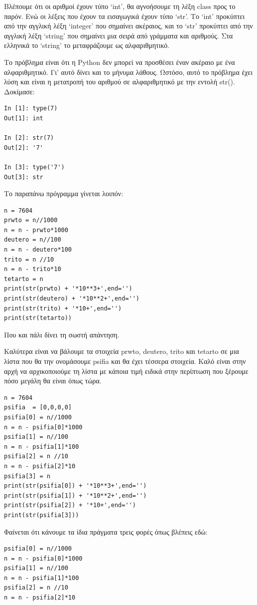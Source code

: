 Βλέπουμε ότι οι αριθμοί έχουν τύπο `int', θα αγνοήσουμε τη λέξη class προς το παρόν. Ενώ οι λέξεις που έχουν τα εισαγωγικά έχουν τύπο `str'. Το `int' προκύπτει από την αγγλική λέξη `integer' που σημαίνει ακέραιος, και το `str' προκύπτει από την αγγλική λέξη `string' που σημαίνει μια σειρά από γράμματα και αριθμούς. Στα ελληνικά το `string' το μεταφράζουμε ως αλφαριθμητικό.

Το πρόβλημα είναι ότι η Python δεν μπορεί να προσθέσει έναν ακέραιο με ένα αλφαριθμητικό. Γι' αυτό δίνει και το μήνυμα λάθους. Ωστόσο, αυτό το πρόβλημα έχει λύση και είναι η μετατροπή του αριθμού σε αλφαριθμητικό με την εντολή str().
Δοκίμασε:
\begin{lstlisting}
In [1]: type(7)
Out[1]: int

In [2]: str(7)
Out[2]: '7'

In [3]: type('7')
Out[3]: str
\end{lstlisting} 

Το παραπάνω πρόγραμμα γίνεται λοιπόν:
\begin{lstlisting}
n = 7604
prwto = n//1000
n = n - prwto*1000
deutero = n//100
n = n - deutero*100
trito = n //10
n = n - trito*10
tetarto = n
print(str(prwto) + '*10**3+',end='')
print(str(deutero) + '*10**2+',end='')
print(str(trito) + '*10+',end='')
print(str(tetarto))
\end{lstlisting}

Που και πάλι δίνει τη σωστή απάντηση.

Καλύτερα είναι να βάλουμε τα στοιχεία prwto, deutero, trito και tetarto σε μια λίστα που θα την ονομάσουμε psifia και θα έχει τέσσερα στοιχεία. Καλό είναι στην αρχή να αρχικοποιούμε τη λίστα με κάποια τιμή ειδικά στην περίπτωση που ξέρουμε πόσο μεγάλη θα είναι όπως τώρα.

\begin{lstlisting}
n = 7604
psifia  = [0,0,0,0]
psifia[0] = n//1000
n = n - psifia[0]*1000
psifia[1] = n//100
n = n - psifia[1]*100
psifia[2] = n //10
n = n - psifia[2]*10
psifia[3] = n
print(str(psifia[0]) + '*10**3+',end='')
print(str(psifia[1]) + '*10**2+',end='')
print(str(psifia[2]) + '*10+',end='')
print(str(psifia[3]))
\end{lstlisting}

Φαίνεται ότι κάνουμε τα ίδια πράγματα τρεις φορές όπως βλέπεις εδώ:
\begin{lstlisting}
psifia[0] = n//1000
n = n - psifia[0]*1000
psifia[1] = n//100
n = n - psifia[1]*100
psifia[2] = n //10
n = n - psifia[2]*10
\end{lstlisting}

